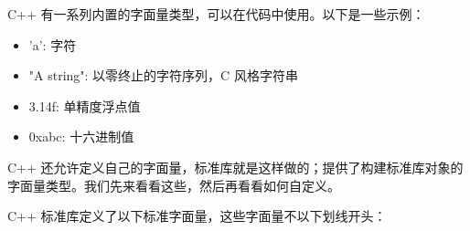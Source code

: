
C++ 有一系列内置的字面量类型，可以在代码中使用。以下是一些示例：

\begin{itemize}
\item
'a': 字符

\item
"A string": 以零终止的字符序列，C 风格字符串

\item
3.14f: 单精度浮点值

\item
0xabc: 十六进制值
\end{itemize}

C++ 还允许定义自己的字面量，标准库就是这样做的；提供了构建标准库对象的字面量类型。我们先来看看这些，然后再看看如何自定义。


C++ 标准库定义了以下标准字面量，这些字面量不以下划线开头：

